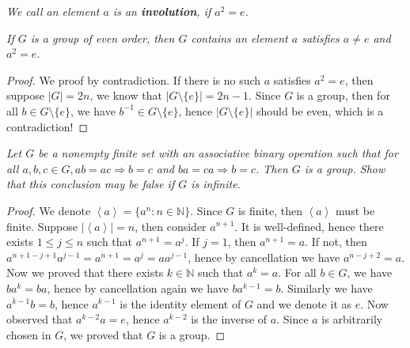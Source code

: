 \begin{note}\em
We call an element $a$ is an \textbf{involution}, if $a^2=e$.
\end{note}
\begin{problem}\em
If $G$ is a group of even order, then $G$ contains an element $a$ satisfies $a\ne e$ and $a^2=e$.
\begin{proof}
We proof by contradiction. If there is no such $a$ satisfies $a^2=e$, then suppose $|G|=2n$, we know that $|G\setminus\{e\}|=2n-1$. Since $G$ is a group, then for all $b\in G\setminus\{e\}$, we have $b^{-1}\in G\setminus\{e\}$, hence $|G\setminus\{e\}|$ should be even, which is a contradiction!
\end{proof}
\end{problem}
\begin{problem}\em
Let $G$ be a nonempty finite set with an associative binary operation such that for all $a,b,c\in G,ab=ac\Rightarrow b=c$ and $ba=ca\Rightarrow b=c$. Then $G$ is a group. Show that this conclusion may be false if $G$ is infinite.
\end{problem}
\begin{proof}
We denote $\left<a\right>=\{a^n:n\in\mathbb{N}\}$. Since $G$ is finite, then $\left<a\right>$ must be finite. Suppose $|\left<a\right>|=n$, then consider $a^{n+1}$. It is well-defined, hence there exists $1\le j\le n$ such that $a^{n+1}=a^j$. If $j=1$, then $a^{n+1}=a$. If not, then $a^{n+1-j+1}a^{j-1}=a^{n+1}=a^j=aa^{j-1}$, hence by cancellation we have $a^{n-j+2}=a$. Now we proved that there exists $k\in\mathbb{N}$ such that $a^k=a$. For all $b\in G$, we have $ba^k=ba$, hence by cancellation again we have $ba^{k-1}=b$. Similarly we have $a^{k-1}b=b$, hence $a^{k-1}$ is the identity element of $G$ and we denote it as $e$. Now observed that $a^{k-2}a=e$, hence $a^{k-2}$ is the inverse of $a$. Since $a$ is arbitrarily chosen in $G$, we proved that $G$ is a group.
\end{proof}
